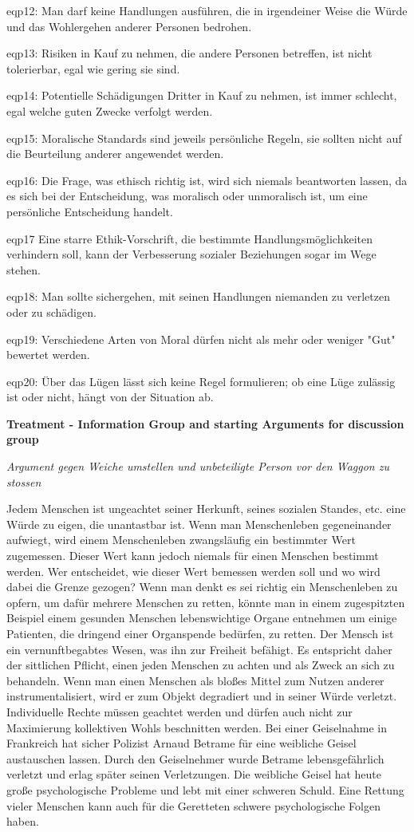 eqp12: Man darf keine Handlungen ausführen, die in irgendeiner Weise die Würde und das Wohlergehen anderer Personen bedrohen.

eqp13: Risiken in Kauf zu nehmen, die andere Personen betreffen, ist nicht tolerierbar, egal wie gering sie sind.

eqp14: Potentielle Schädigungen Dritter in Kauf zu nehmen, ist immer schlecht, egal welche guten Zwecke verfolgt werden.

eqp15: Moralische Standards sind jeweils persönliche Regeln, sie sollten nicht auf die Beurteilung anderer angewendet werden.

eqp16: Die Frage, was ethisch richtig ist, wird sich niemals beantworten lassen, da es sich bei der Entscheidung, was moralisch oder unmoralisch ist, um eine persönliche Entscheidung handelt.

eqp17 Eine starre Ethik-Vorschrift, die bestimmte Handlungsmöglichkeiten verhindern soll, kann der Verbesserung sozialer Beziehungen sogar im Wege stehen.

eqp18: Man sollte sichergehen, mit seinen Handlungen niemanden zu verletzen oder zu schädigen.

eqp19: Verschiedene Arten von Moral dürfen nicht als mehr oder weniger "Gut" bewertet werden.

eqp20: Über das Lügen lässt sich keine Regel formulieren; ob eine Lüge zulässig ist oder nicht, hängt von der Situation ab.


\newpage

\textbf{Treatment - Information Group and starting Arguments for discussion group}

\textit{Argument gegen Weiche umstellen und unbeteiligte Person vor den Waggon zu stossen}

Jedem Menschen ist ungeachtet seiner Herkunft, seines sozialen Standes, etc. eine Würde zu eigen, die unantastbar ist. Wenn man Menschenleben gegeneinander aufwiegt, wird einem Menschenleben zwangsläufig ein bestimmter Wert zugemessen. Dieser Wert kann jedoch niemals für einen Menschen bestimmt werden. Wer entscheidet, wie dieser Wert bemessen werden soll und wo wird dabei die Grenze gezogen? Wenn man denkt es sei richtig ein Menschenleben zu opfern, um dafür mehrere Menschen zu retten, könnte man in einem zugespitzten Beispiel einem gesunden Menschen lebenswichtige Organe entnehmen um einige Patienten, die dringend einer Organspende bedürfen, zu retten.
Der Mensch ist ein vernunftbegabtes Wesen, was ihn zur Freiheit befähigt. Es entspricht daher der sittlichen Pflicht, einen jeden Menschen zu achten und als Zweck an sich zu behandeln. Wenn man einen Menschen als bloßes Mittel zum Nutzen anderer instrumentalisiert, wird er zum Objekt degradiert und in seiner Würde verletzt. Individuelle Rechte müssen geachtet werden und dürfen auch nicht zur Maximierung kollektiven Wohls beschnitten werden.
Bei einer Geiselnahme in Frankreich hat sicher Polizist Arnaud Betrame für eine weibliche Geisel austauschen lassen. Durch den Geiselnehmer wurde Betrame lebensgefährlich verletzt und erlag später seinen Verletzungen. Die weibliche Geisel hat heute große psychologische Probleme und lebt mit einer schweren Schuld. Eine Rettung vieler Menschen kann auch für die Geretteten schwere psychologische Folgen haben.

